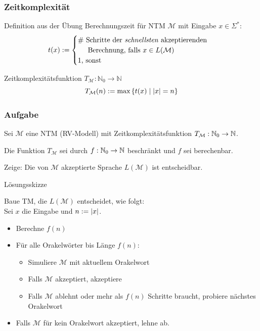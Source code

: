 \begin{frame}

\frametitle{Zeitkomplexität}
\begin{block}{Definition aus der Übung}
    Berechnungszeit für NTM $\mathcal{M}$ mit Eingabe $x \in \Sigma^*$: \\
    $$t(x) := \begin{cases}
                \text{\# Schritte der \emph{schnellsten} akzeptierenden} \\ \hspace{0.5cm}\text{Berechnung, falls  } x \in L(\mathcal{M})\\ 
                1 \text{, sonst}
             \end{cases} $$
 
    Zeitkomplexitätsfunktion $T_\mathcal{M} : \mathbb{N}_0 \rightarrow \mathbb{N}$ \\
    $$T_\mathcal{M}(n) := \text{max}\left\{t(x) \mid \left\vert x \right\vert = n \right\}$$

\end{block}

\end{frame}


\begin{frame}
	\frametitle{Aufgabe}
	
	Sei $\mathcal{M}$ eine NTM (RV-Modell) mit Zeitkomplexitätsfunktion $T_\mathcal{M} : \mathbb{N}_0 \rightarrow \mathbb{N}$.
	
	Die Funktion $T_\mathcal{M}$ sei durch $f : \mathbb{N}_0 \rightarrow \mathbb{N}$ beschränkt und $f$ sei berechenbar.
	
	Zeige: Die von $\mathcal{M}$ akzeptierte Sprache $L(\mathcal{M})$ ist entscheidbar.
	
	\invincible \pause
	\begin{block}{Lösungsskizze}
	
	Baue TM, die $L(\mathcal{M})$ entscheidet, wie folgt: \\ Sei $x$ die Eingabe und $n := \left\vert x \right\vert$.
	
	\begin{itemize}
		\item Berechne $f(n)$
		\item Für alle Orakelwörter bis Länge $f(n)$:
		\begin{itemize}
		\item Simuliere $\mathcal{M}$ mit aktuellem Orakelwort
		\item Falls $\mathcal{M}$ akzeptiert, akzeptiere
		\item Falls $\mathcal{M}$ ablehnt oder mehr als $f(n)$ Schritte braucht, probiere nächstes Orakelwort
		\end{itemize}
		\item Falls $\mathcal{M}$ für kein Orakelwort akzeptiert, lehne ab.
	\end{itemize}
	\vincible
	\end{block}
\end{frame}


